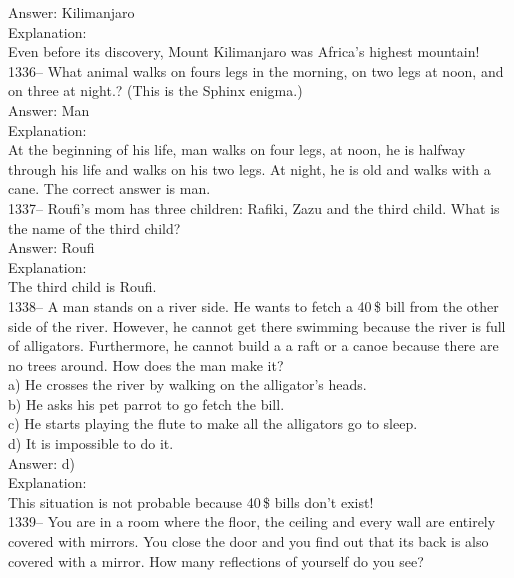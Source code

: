 \documentclass[letterpaper, 12pt]{article}
\begin{document}
Answer: Kilimanjaro\\

Explanation: \\
Even before its discovery, Mount Kilimanjaro was Africa's highest mountain!\\

1336-- What animal walks on fours legs in the morning, on two legs at noon, and on three at night.? (This is the Sphinx enigma.)\\

Answer: Man\\

Explanation: \\
At the beginning of his life, man walks on four legs, at noon, he is halfway through his life and walks on his two legs. At night, he is old and walks with a cane. The correct answer is man.\\

1337-- Roufi's mom has three children: Rafiki, Zazu and the third child.  What is the name of the third child?\\

Answer: Roufi\\

Explanation: \\
The third child is Roufi.\\

1338-- A man stands on a river side. He wants to fetch a 40\,\$ bill from the other side of the river. However, he cannot get there swimming because the river is full of alligators. Furthermore, he cannot build a a raft or a canoe because there are no trees around. How does the man make it?\\

a) He crosses the river by walking on the alligator's heads.\\
b) He asks his pet parrot to go fetch the bill.\\
c) He starts playing the flute to make all the alligators go to sleep.\\
d) It is impossible to do it.\\


Answer: d)\\

Explanation: \\
This situation is not probable because 40\,\$ bills don't exist! \\

1339-- You are in a room where the floor, the ceiling and every wall are entirely covered with mirrors. You close the door and you find out that its back is also covered with a mirror. How many reflections of yourself do you see?\\
\end{document}
